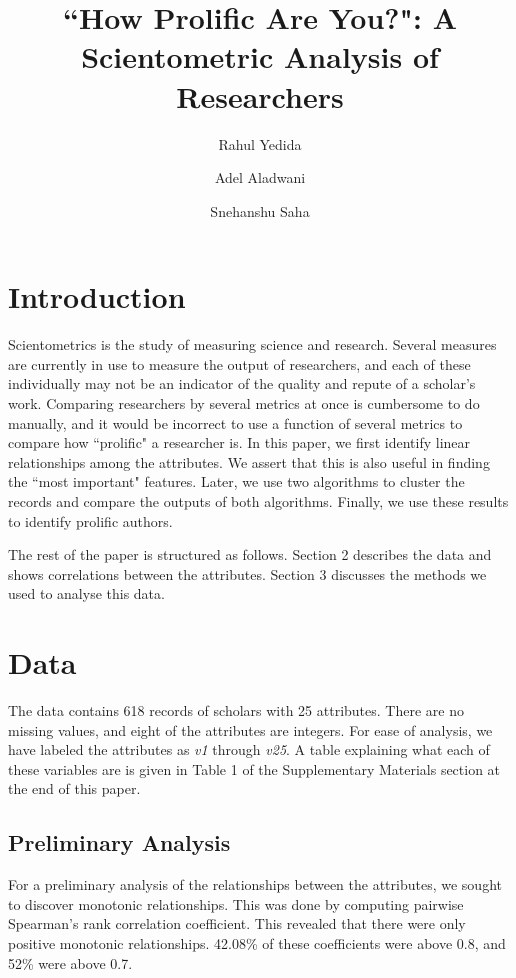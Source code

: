 \documentclass[12pt,a4paper,twocolumn]{article}
\title{``How Prolific Are You?": A Scientometric Analysis of Researchers}
\author[1]{Rahul Yedida}
\author[2]{Adel Aladwani}
\author[1]{Snehanshu Saha}
\affil[1]{Department of Computer Science \& Engineering, PES University}
\affil[2]{Department of Information Systems, Kuwait University}
\date{}
\begin{document}
	\maketitle
	
	
	\section{Introduction}
	Scientometrics is the study of measuring science and research. Several measures are currently in use to measure the output of researchers, and each of these individually may not be an indicator of the quality and repute of a scholar's work. Comparing researchers by several metrics at once is cumbersome to do manually, and it would be incorrect to use a function of several metrics to compare how ``prolific" a researcher is. In this paper, we first identify linear relationships among the attributes. We assert that this is also useful in finding the ``most important" features. Later, we use two algorithms to cluster the records and compare the outputs of both algorithms. Finally, we use these results to identify prolific authors. 
	
	The rest of the paper is structured as follows. Section 2 describes the data and shows correlations between the attributes. Section 3 discusses the methods we used to analyse this data.
	
	\section{Data}
	The data contains 618 records of scholars with 25 attributes. There are no missing values, and eight of the attributes are integers. For ease of analysis, we have labeled the attributes as \textit{v1} through \textit{v25}. A table explaining what each of these variables are is given in Table 1 of the Supplementary Materials section at the end of this paper.
	
	\subsection{Preliminary Analysis}
	For a preliminary analysis of the relationships between the attributes, we sought to discover monotonic relationships. This was done by computing pairwise Spearman's rank correlation coefficient. This revealed that there were only positive monotonic relationships. 42.08\% of these coefficients were above 0.8, and 52\% were above 0.7.
	
\end{document}
